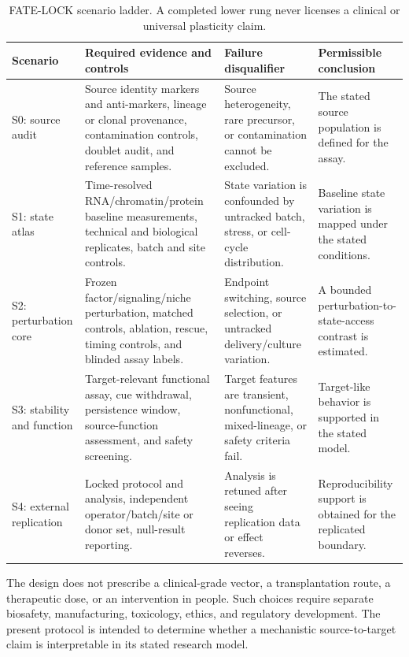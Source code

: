 \documentclass[10pt,conference]{IEEEtran}
\begin{document}
\begin{table}[!t]
\caption{FATE-LOCK scenario ladder. A completed lower rung never licenses a clinical or universal plasticity claim.}
\label{tab:scenario-ladder}
\centering
\footnotesize
\begin{tabular}{@{}p{}p{}p{}p{}@{}}
\toprule
Scenario & Required evidence and controls & Failure disqualifier & Permissible conclusion \\
\midrule
S0: source audit & Source identity markers and anti-markers, lineage or clonal provenance, contamination controls, doublet audit, and reference samples. & Source heterogeneity, rare precursor, or contamination cannot be excluded. & The stated source population is defined for the assay. \\
S1: state atlas & Time-resolved RNA/chromatin/protein baseline measurements, technical and biological replicates, batch and site controls. & State variation is confounded by untracked batch, stress, or cell-cycle distribution. & Baseline state variation is mapped under the stated conditions. \\
S2: perturbation core & Frozen factor/signaling/niche perturbation, matched controls, ablation, rescue, timing controls, and blinded assay labels. & Endpoint switching, source selection, or untracked delivery/culture variation. & A bounded perturbation-to-state-access contrast is estimated. \\
S3: stability and function & Target-relevant functional assay, cue withdrawal, persistence window, source-function assessment, and safety screening. & Target features are transient, nonfunctional, mixed-lineage, or safety criteria fail. & Target-like behavior is supported in the stated model. \\
S4: external replication & Locked protocol and analysis, independent operator/batch/site or donor set, null-result reporting. & Analysis is retuned after seeing replication data or effect reverses. & Reproducibility support is obtained for the replicated boundary. \\
\bottomrule
\end{tabular}
\end{table}

The design does not prescribe a clinical-grade vector, a transplantation route, a therapeutic dose, or an intervention in people. Such choices require separate biosafety, manufacturing, toxicology, ethics, and regulatory development. The present protocol is intended to determine whether a mechanistic source-to-target claim is interpretable in its stated research model.
\end{document}
